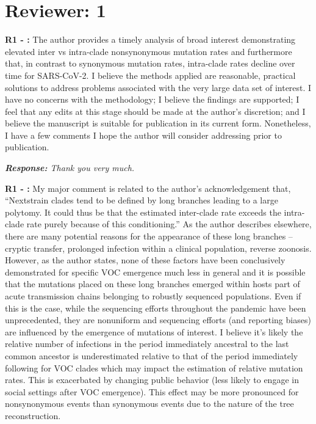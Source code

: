 \documentclass[aps,rmp,onecolumn]{revtex4-1}
\newcounter{counter1}[section]
\newcounter{counter2}[section]
\newcounter{counter3}[section]
\newcommand{\refa}[1]{\vskip 5mm \textbf{R1 - \stepcounter{counter1}\arabic{counter1}:} #1}
\newcommand{\response}[1]{{\it {\color{response}\textbf{Response:} #1}}\vskip 5mm}
\begin{document}
\section*{Reviewer: 1}

\refa{
The author provides a timely analysis of broad interest demonstrating elevated inter vs intra-clade nonsynonymous mutation rates and furthermore that, in contrast to synonymous mutation rates, intra-clade rates decline over time for SARS-CoV-2. I believe the methods applied are reasonable, practical solutions to address problems associated with the very large data set of interest. I have no concerns with the methodology; I believe the findings are supported; I feel that any edits at this stage should be made at the author's discretion; and I believe the manuscript is suitable for publication in its current form. Nonetheless, I have a few comments I hope the author will consider addressing prior to publication.}

\response{Thank you very much.}

\refa{My major comment is related to the author's acknowledgement that, ``Nextstrain clades tend to be defined by long branches leading to a large polytomy. It could thus be that the estimated inter-clade rate exceeds the intra-clade rate purely because of this conditioning.'' As the author describes elsewhere, there are many potential reasons for the appearance of these long branches -- cryptic transfer, prolonged infection within a clinical population, reverse zoonosis. However, as the author states, none of these factors have been conclusively demonstrated for specific VOC emergence much less in general and it is possible that the mutations placed on these long branches emerged within hosts part of acute transmission chains belonging to robustly sequenced populations. Even if this is the case, while the sequencing efforts throughout the pandemic have been unprecedented, they are nonuniform and sequencing efforts (and reporting biases) are influenced by the emergence of mutations of interest. I believe it's likely the relative number of infections in the period immediately ancestral to the last common ancestor is underestimated relative to that of the period immediately following for VOC clades which may impact the estimation of relative mutation rates. This is exacerbated by changing public behavior (less likely to engage in social settings after VOC emergence). This effect may be more pronounced for nonsynonymous events than synonymous events due to the nature of the tree reconstruction.}
\end{document}
